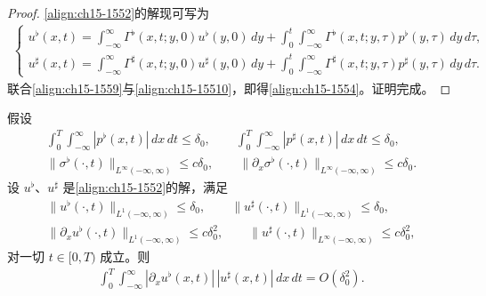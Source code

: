 \documentclass[../../main.tex]{subfiles}
\begin{document}
\begin{proof}
\eqref{align:ch15-1552}的解现可写为
\begin{align}
\begin{cases}
u^\flat(x,t)=\displaystyle\int_{-\infty}^{\infty}\Gamma^\flat(x,t;y,0)u^\flat(y,0)\,dy+\int_0^t\int_{-\infty}^{\infty}\Gamma^\flat(x,t;y,\tau)p^\flat(y,\tau)\,dy\,d\tau,\\[2mm]
u^\sharp(x,t)=\displaystyle\int_{-\infty}^{\infty}\Gamma^\sharp(x,t;y,0)u^\sharp(y,0)\,dy+\int_0^t\int_{-\infty}^{\infty}\Gamma^\sharp(x,t;y,\tau)p^\sharp(y,\tau)\,dy\,d\tau.
\end{cases}
\label{align:ch15-15510}
\end{align}
联合\eqref{align:ch15-1559}与\eqref{align:ch15-15510}，即得\eqref{align:ch15-1554}。证明完成。
\end{proof}

\begin{lemma}\label{lemma:ch15-横波导数估计}
假设
\begin{align}
\int_0^T\int_{-\infty}^{\infty}|p^\flat(x,t)|\,dx\,dt\leqslant\delta_0,\qquad\int_0^T\int_{-\infty}^{\infty}|p^\sharp(x,t)|\,dx\,dt\leqslant\delta_0,
\label{align:ch15-15511}\\
\|\sigma^\flat(\cdot,t)\|_{L^\infty(-\infty,\infty)}\leqslant c\delta_0,\qquad\|\partial_x\sigma^\flat(\cdot,t)\|_{L^\infty(-\infty,\infty)}\leqslant c\delta_0.
\label{align:ch15-15512}
\end{align}
设 $u^\flat$、$u^\sharp$ 是\eqref{align:ch15-1552}的解，满足
\begin{align}
\|u^\flat(\cdot,t)\|_{L^1(-\infty,\infty)}\leqslant\delta_0,\qquad\|u^\sharp(\cdot,t)\|_{L^1(-\infty,\infty)}\leqslant\delta_0,
\label{align:ch15-15513}\\
\|\partial_xu^\flat(\cdot,t)\|_{L^1(-\infty,\infty)}\leqslant c\delta_0^2,\qquad\|u^\sharp(\cdot,t)\|_{L^\infty(-\infty,\infty)}\leqslant c\delta_0^2,
\label{align:ch15-15514}
\end{align}
对一切 $t\in[0,T)$ 成立。则
\begin{align}
\int_0^T\int_{-\infty}^{\infty}|\partial_xu^\flat(x,t)|\,|u^\sharp(x,t)|\,dx\,dt=O(\delta_0^2).
\label{align:ch15-15515}
\end{align}
\end{lemma}
\end{document}
